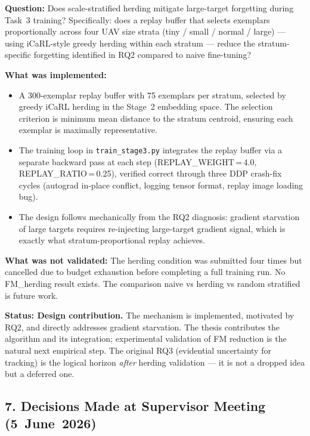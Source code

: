 \textbf{Question:} Does scale-stratified herding mitigate large-target
forgetting during Task~3 training? Specifically: does a replay buffer
that selects exemplars proportionally across four UAV size strata
(tiny / small / normal / large) — using iCaRL-style greedy herding
within each stratum — reduce the stratum-specific forgetting identified
in RQ2 compared to naive fine-tuning?

\textbf{What was implemented:}
\begin{itemize}
    \item A 300-exemplar replay buffer with 75 exemplars per stratum,
    selected by greedy iCaRL herding in the Stage~2 embedding space.
    The selection criterion is minimum mean distance to the stratum
    centroid, ensuring each exemplar is maximally representative.
    \item The training loop in \texttt{train\_stage3.py} integrates the
    replay buffer via a separate backward pass at each step (REPLAY\_WEIGHT\,=\,4.0,
    REPLAY\_RATIO\,=\,0.25), verified correct through three DDP crash-fix cycles
    (autograd in-place conflict, logging tensor format, replay image loading bug).
    \item The design follows mechanically from the RQ2 diagnosis: gradient
    starvation of large targets requires re-injecting large-target gradient
    signal, which is exactly what stratum-proportional replay achieves.
\end{itemize}

\textbf{What was not validated:} The herding condition was submitted four times
but cancelled due to budget exhaustion before completing a full training run.
No FM\_herding result exists. The comparison naive vs herding vs random
stratified is future work.

\noindent \textbf{Status: Design contribution.} The mechanism is implemented,
motivated by RQ2, and directly addresses gradient starvation. The thesis
contributes the algorithm and its integration; experimental validation of FM
reduction is the natural next empirical step. The original RQ3 (evidential
uncertainty for tracking) is the logical horizon \textit{after} herding
validation — it is not a dropped idea but a deferred one.

\subsection*{7. Decisions Made at Supervisor Meeting (5~June~2026)}


